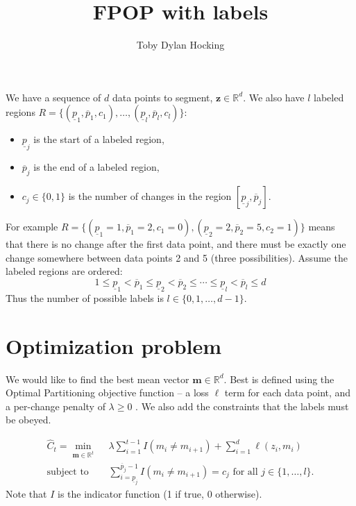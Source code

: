 \documentclass{article}
\newcommand{\RR}{\mathbb R}
\begin{document}
\title{FPOP with labels}
\author{Toby Dylan Hocking}
\maketitle

We have a sequence of $d$ data points to segment,
$\mathbf z\in\mathbb R^d$. We also have $l$ labeled regions
$R=\{(\underline p_1, \overline p_1, c_1), \dots,
(\underline p_l, \overline p_l, c_l)\}$:
\begin{itemize}
\item $\underline p_j$ is the start of a labeled region,
\item $\overline p_j$ is the end of a labeled region,
\item $c_j\in\{0,1\}$ is the number of changes in the region
  $[\underline p_j, \overline p_j]$. 
\end{itemize}
For example
$R=\{(\underline p_1=1,\overline p_1=2,c_1=0),(\underline
p_2=2,\overline p_2=5,c_2=1)\}$ means that there is no change after
the first data point, and there must be exactly one change somewhere
between data points 2 and 5 (three possibilities). Assume the
labeled regions are ordered:
\begin{equation}
  \label{eq:sorted}
  1 \leq 
\underline p_1 < \overline p_1 \leq 
\underline p_2 < \overline p_2 \leq
\cdots \leq 
\underline p_l < \overline p_l \leq 
d
\end{equation}
Thus the number of possible labels is $l\in\{0, 1, \dots, d-1\}$.

\section{Optimization problem}

We would like to find the best mean vector $\mathbf m\in\mathbb R^d$.
Best is defined using the Optimal Partitioning objective function -- a
loss $\ell$ term for each data point, and a per-change penalty of
$\lambda\geq 0$ \citep{Maidstone2016}. We also add the constraints that the
labels must be obeyed.

\begin{align}
\hat C_t = \min_{
  \mathbf m\in\RR^{t}
  } &\ \ 
\lambda\sum_{i=1}^{t-1} I(m_i \neq m_{i+1})
+
\sum_{i=1}^d \ell(z_i, m_i) 
  \label{LabeledProb}
\\
    \text{subject to} 
& \ \ \sum_{i=\underline p_j}^{\overline p_j-1} I(m_i \neq m_{i+1})=c_j
\text{ for all } j\in\{1,\dots,l\}.
\nonumber
\end{align}
Note that $I$ is the indicator function (1 if true, 0 otherwise).
\end{document}
